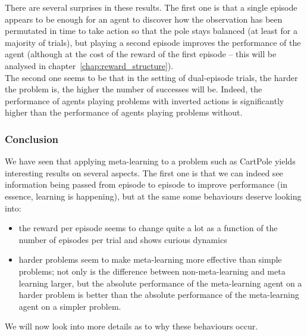 There are several surprises in these results. The first one is that a single
episode appears to be enough for an agent to discover how the observation has
been permutated in time to take action so that the pole stays balanced (at least
for a majority of trials), but playing a second episode improves the performance
of the agent (although at the cost of the reward of the first episode -- this
will be analysed in chapter~\ref{chap:reward_structure}).\\

The second one seems to be that in the setting of dual-episode trials, the
harder the problem is, the higher the number of successes will be. Indeed,
the performance of agents playing problems with inverted actions is 
significantly higher than the performance of agents playing problems without.


\subsubsection{Conclusion}
We have seen that applying meta-learning to a problem such as CartPole yields
interesting results on several aspects. The first one is that we can
indeed see information being passed from episode to episode to improve 
performance (in essence, learning is happening), but at the same some
behaviours deserve looking into:
\begin{itemize}
	\item the reward per episode seems to change quite a lot as a function
		of the number of episodes per trial and shows curious
		dynamics
	\item harder problems seem to make meta-learning more effective than
		simple problems; not only is the difference between 
		non-meta-learning and meta learning larger, but the absolute
		performance of the meta-learning agent on a harder problem
		is better than the absolute performance of the meta-learning
		agent on a simpler problem.
\end{itemize}

We will now look into more details as to why these behaviours occur.





